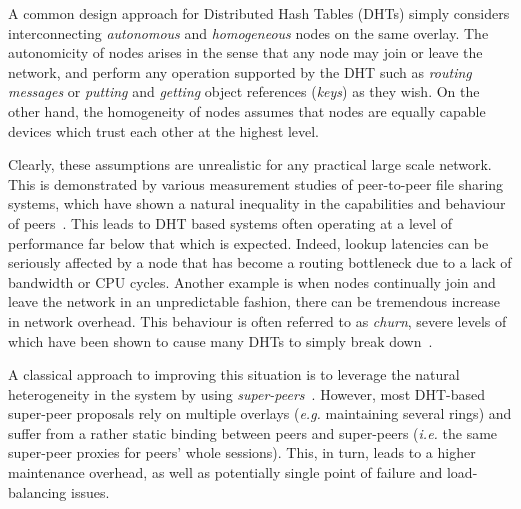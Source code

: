 \documentclass[letterpaper]{sig-alternate} %
\begin{document}
A common design approach for Distributed Hash Tables (DHTs) simply
considers interconnecting {\em autonomous} and {\em homogeneous}
nodes on the same overlay. The autonomicity of nodes arises in the
sense that any node may join or leave the network, and perform any
operation supported by the DHT such as {\em routing messages} or
{\em putting} and {\em getting} object references ({\em keys}) as
they wish. On the other hand, the homogeneity of nodes assumes that
nodes are equally capable devices which trust each other at the
highest level.

Clearly, these assumptions are unrealistic for any practical large
scale network. This is demonstrated by various measurement studies
of peer-to-peer file sharing systems, which have shown a natural
inequality in the capabilities and behaviour of peers~\cite{sgg02}.
This leads to DHT based systems often operating at a level of
performance far below that which is expected. Indeed, lookup
latencies can be seriously affected by a node that has become a
routing bottleneck due to a lack of bandwidth or CPU cycles. Another
example is when nodes continually join and leave the network in an
unpredictable fashion, there can be tremendous increase in network
overhead. This behaviour is often referred to as \emph{churn},
severe levels of which have been shown to cause many DHTs to simply
break down~\cite{mobilechurn,dhtmanet01,churn1}.

A classical approach to improving this situation is to leverage the natural
heterogeneity in the system by using \emph{super-peers}~\cite{
mizrak03structured, zhu03superpeer}. However, most DHT-based super-peer
proposals rely on multiple overlays (\emph{e.g.} maintaining several rings) and
suffer from a rather static binding between peers and super-peers (\emph{i.e.}
the same super-peer proxies for peers' whole sessions). This, in turn, leads to
a higher maintenance overhead, as well as potentially single point of failure
and load-balancing issues.
\end{document}
